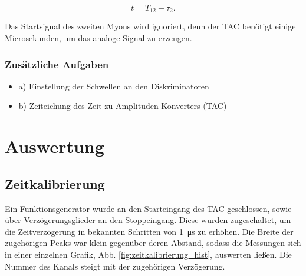 \documentclass[a4paper,ngerman]{scrartcl}
\begin{document}
\begin{equation}
t = T_{12} - \tau_2 .
\end{equation}

Das Startsignal des zweiten Myons wird ignoriert, denn der TAC benötigt einige Microsekunden, um das analoge Signal zu erzeugen.



\subsubsection{Zusätzliche Aufgaben}

\begin{itemize}
\item a) Einstellung der Schwellen an den Diskriminatoren
\item b) Zeiteichung des Zeit-zu-Amplituden-Konverters (TAC)
\end{itemize}

\newpage

\section{Auswertung}

\subsection{Zeitkalibrierung}

Ein Funktionsgenerator wurde an den Starteingang des TAC geschlossen, sowie über Verzögerungsglieder an den Stoppeingang. Diese wurden zugeschaltet, um die Zeitverzögerung in bekannten Schritten von \SI{1}{\micro\second} zu erhöhen. Die Breite der zugehörigen Peaks war klein gegenüber deren Abstand, sodass die Messungen sich in einer einzelnen Grafik, Abb. \ref{fig:zeitkalibrierung_hist}, auswerten ließen. Die Nummer des Kanals steigt mit der zugehörigen Verzögerung. 
\end{document}
